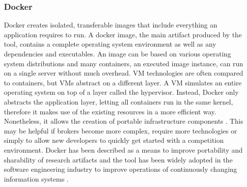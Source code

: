 
\subsubsection{Docker}
\label{sub:docker}

Docker creates isolated, transferable images that include everything an application requires to run. A docker image, the
main artifact produced by the tool, contains a complete operating system environment as well as any dependencies and
executables. An
image can be based on various operating system distributions and many containers, an executed image instance, can run on a single server without much overhead.
\ac{VM} technologies are often compared to containers, but \ac{VM}s abstract on a different layer. A \ac{VM} simulates
an entire operating system on top of a layer called the hypervisor. Instead, Docker only abstracts the application
layer, letting all containers run in the same kernel, therefore it makes use of the existing resources in a more
efficient way. Nonetheless, it allows the creation of portable infrastructure components
\citep{boettiger2015introduction, docker}. This may be helpful if brokers become more complex, require more
technologies or simply to allow new developers to quickly get started with a competition environment. Docker has been
described as a means to improve portability and sharability of research artifacts and the tool has been widely adopted
in the software engineering industry to improve operations of continuously changing information systems
\citep{boettiger2015introduction}.


